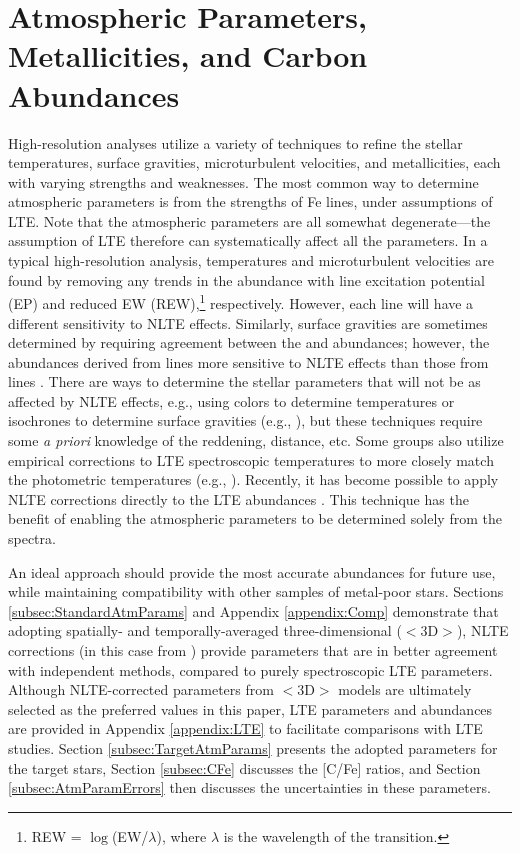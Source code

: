 \documentclass[preprint]{aastex61}
\begin{document}
\section{Atmospheric Parameters, Metallicities, and Carbon Abundances}\label{sec:AtmParams}
High-resolution analyses utilize a variety of techniques to refine the
stellar temperatures, surface gravities, microturbulent velocities,
and metallicities, each with varying strengths and weaknesses.
The most common way to determine atmospheric parameters is from
the strengths of Fe lines, under assumptions of LTE.  
  Note that the atmospheric parameters are all somewhat
  degenerate---the assumption of LTE therefore can systematically
  affect all the parameters.  In a typical high-resolution analysis,
temperatures and microturbulent velocities are found by removing any
trends in the  abundance with line excitation potential
(EP) and reduced EW (REW),\footnote{REW = $\log$(EW/$\lambda$), where
  $\lambda$ is the   wavelength of the transition.} respectively.
However, each  line will have a different sensitivity to
NLTE effects. Similarly, surface gravities are sometimes determined
by requiring agreement between the  and 
abundances; however, the abundances derived from  lines
more sensitive to NLTE effects than those from  lines
\citep{KraftIvans2003}.  There are ways to determine the stellar
parameters that will not be as affected by NLTE effects, e.g., using
colors \citep{RamirezMelendez2005,Casagrande2010} to determine
temperatures or isochrones to determine surface gravities (e.g.,
\citealt{Sakari2017}), but these techniques require some {\it a
  priori} knowledge of the reddening, distance, etc.  Some groups also
utilize empirical corrections to LTE spectroscopic temperatures to more
closely match the photometric temperatures (e.g.,
\citealt{Frebel2013}).  Recently, it has become
  possible to apply NLTE corrections directly to the LTE abundances
  \citep{Lind2012,Ruchti2013,Amarsi2016,Ezzeddine2017}.  This
technique has the benefit of enabling the atmospheric parameters to be
determined solely from the spectra.

An ideal approach should provide the most accurate abundances for
future use, while maintaining compatibility with other samples of
metal-poor stars.  Sections \ref{subsec:StandardAtmParams} and Appendix
\ref{appendix:Comp} demonstrate that adopting spatially- and
temporally-averaged three-dimensional ($<$3D$>$), NLTE corrections (in
this case from \citealt{Amarsi2016}) provide parameters that are in
better agreement with independent methods, compared to purely
spectroscopic LTE parameters.  Although NLTE-corrected parameters from
$<$3D$>$ models are ultimately selected as the preferred values in
this paper, LTE parameters and abundances are provided in Appendix
\ref{appendix:LTE} to facilitate comparisons with LTE studies. Section
\ref{subsec:TargetAtmParams} presents the adopted parameters for the
target stars, Section \ref{subsec:CFe} discusses the [C/Fe] ratios,
and Section \ref{subsec:AtmParamErrors} then discusses the
uncertainties in these parameters.
\end{document}

